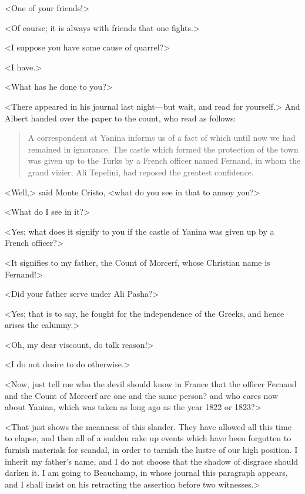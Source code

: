  <One of your friends!> 

 <Of course; it is always with friends that one fights.> 

 <I suppose you have some cause of quarrel?> 

 <I have.>

<What has he done to you?> 

 <There appeared in his journal last night—but wait, and read for yourself.> And Albert handed over the paper to the count, who read as follows: 
 
 \begin{quote}
A correspondent at Yanina informs us of a fact of which until now we had remained in ignorance. The castle which formed the protection of the town was given up to the Turks by a French officer named Fernand, in whom the grand vizier, Ali Tepelini, had reposed the greatest confidence.
\end{quote}

 <Well,> said Monte Cristo, <what do you see in that to annoy you?> 

 <What do I see in it?> 

 <Yes; what does it signify to you if the castle of Yanina was given up by a French officer?> 

 <It signifies to my father, the Count of Morcerf, whose Christian name is Fernand!> 

 <Did your father serve under Ali Pasha?> 

 <Yes; that is to say, he fought for the independence of the Greeks, and hence arises the calumny.> 

 <Oh, my dear viscount, do talk reason!> 

 <I do not desire to do otherwise.> 

 <Now, just tell me who the devil should know in France that the officer Fernand and the Count of Morcerf are one and the same person? and who cares now about Yanina, which was taken as long ago as the year 1822 or 1823?> 

 <That just shows the meanness of this slander. They have allowed all this time to elapse, and then all of a sudden rake up events which have been forgotten to furnish materials for scandal, in order to tarnish the lustre of our high position. I inherit my father's name, and I do not choose that the shadow of disgrace should darken it. I am going to Beauchamp, in whose journal this paragraph appears, and I shall insist on his retracting the assertion before two witnesses.> 

